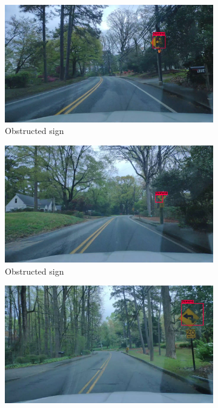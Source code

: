 \begin{figure}
  \begin{center}
    \begin{subfigure}[t]{.49\linewidth}
      \centering
      \includegraphics[width=0.99\linewidth]{figures/examples/westwestley/TP/TP04.jpg}
      \caption{Obstructed sign}
      \label{fig:wwObs1TP}
    \end{subfigure}
    \begin{subfigure}[t]{.49\linewidth}
      \centering
      \includegraphics[width=0.99\linewidth]{figures/examples/westwestley/TP/TP02.jpg}
      \caption{Obstructed sign}
      \label{fig:wwObs2TP}
    \end{subfigure}
    \begin{subfigure}[t]{.49\linewidth}
      \centering
      \includegraphics[width=0.99\linewidth]{figures/examples/westwestley/TP/TP05.png}

\end{subfigure}
\end{center}
\end{figure}
